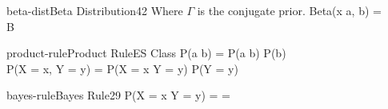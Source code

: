 \documentclass[12pt]{article}
\begin{document}
\begin{sgequationpagedesc}{beta-dist}{Beta Distribution}{42}{%
Where $\Gamma$ is the conjugate prior.}
\textrm{Beta}(x \g a, b) = \\
B \df {}
\end{sgequationpagedesc}

\begin{sgequation}{product-rule}{Product Rule}{ES Class}
P(a \a b) = P(a \g b) P(b) \Leftrightarrow\\
P(X = x, Y = y) = P(X = x \g Y = y) \cdot P(Y = y)
\end{sgequation}

\begin{sgequationpage}{bayes-rule}{Bayes Rule}{29}
P(X = x \g Y = y) =  =
\end{sgequationpage}
\end{document}
